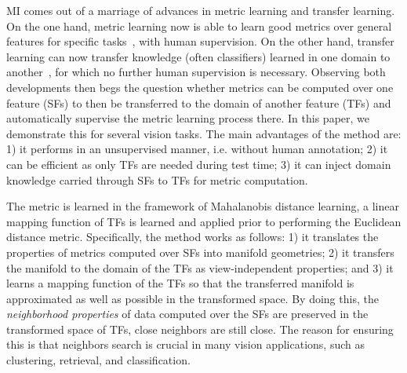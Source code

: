 MI comes out of a marriage of advances in metric learning and transfer
learning. On the one hand, metric learning now is able to learn good
metrics over general features for specific tasks~\citep{metric:survey:12}, with human
supervision.
On the other hand, transfer learning can now transfer knowledge (often
classifiers) learned in one domain to
another~\citep{tl:survey}, for which no further human supervision is
necessary. Observing both developments then begs the question whether
metrics can be computed over one feature (\ie SFs) to then be
transferred to the domain of another feature (\ie TFs) and
automatically supervise the metric learning process there. 
In this paper, we demonstrate this for several vision tasks. The main
advantages of the method are: 1) it performs in an unsupervised
manner, i.e. without human annotation; 2) it can be efficient as only
TFs are needed during test time; 3) it can inject domain knowledge
carried through SFs to TFs for metric computation.  

The metric is learned in the framework of Mahalanobis distance
learning, \ie a linear mapping function of TFs is learned and applied
prior to performing the Euclidean distance metric. Specifically, the
method works as follows: 1) it translates the properties of metrics
computed over SFs into manifold geometries; 2) it transfers the
manifold to the domain of the TFs as view-independent properties; and
3) it learns a mapping function of the TFs so that the transferred
manifold is approximated as well as possible in the transformed
space. By doing this, the \emph{neighborhood properties} of data computed
over the SFs are preserved in the transformed space of TFs, \ie close
neighbors are still close. The reason for ensuring this is that
neighbors search is crucial in many vision applications,
such as clustering, retrieval, and classification.


